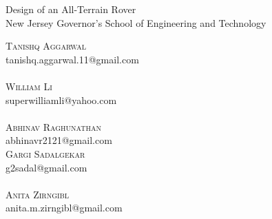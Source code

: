 \documentclass[11pt]{article}
\numberwithin{figure}{section}
\begin{document}
\begin{center}
\LARGE{Design of an All-Terrain Rover} \\
\normalsize{New Jersey Governor's School of Engineering and Technology}
\end{center}
\begin{multicols}{2}
\noindent \textsc{Tanishq Aggarwal} \\ tanishq.aggarwal.11@gmail.com \\
\\ \textsc{William Li} \\ superwilliamli@yahoo.com \\
\\ \textsc{Abhinav Raghunathan} \\ abhinavr2121@gmail.com
\columnbreak
\\ \textsc{Gargi Sadalgekar} \\ g2sadal@gmail.com \\ 
\\ \textsc{Anita Zirngibl} \\ anita.m.zirngibl@gmail.com 
\end{multicols}
\end{document}
